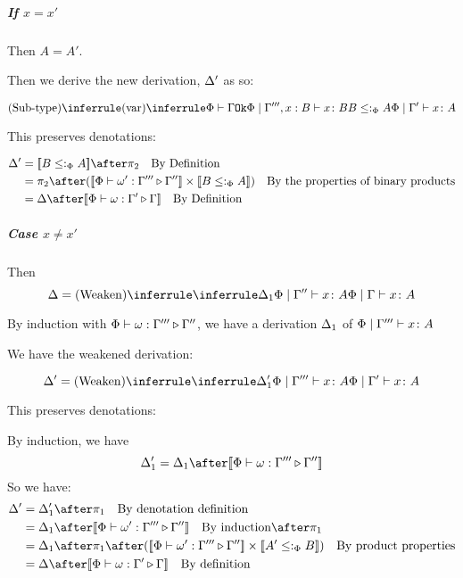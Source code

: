 {        \subparagraph{If $x = x'$}

        Then $A = A'$.

        Then we derive the new derivation, $\Delta'$ as so:

        \begin{equation}
            \ntreeruleII{Sub-type}{
                \ntreeruleI{var}{\oke{\P}{\G}}{\etyperelation{\P}{\G''', x: B}{x}{B}}
                }{
                B \subtypep A
            }{
                \etyperelation{\P}{\G'}{x}{A}
            }
        \end{equation}

        This preserves denotations:

        \begin{align}
            \D' & = \deno{B\subtypep A}\after\pp\qt{By Definition} \\
             & = \pp\after (\deno{\ewrel{\P}{\w'}{\G'''}{\G''}}\times \deno{B\subtypep A}) \qt{By the properties of binary products}\\
             & = \D\after\deno{\ewrel{\P}{\w}{\G'}{\G}}\qt{By Definition}
        \end{align}

        \subparagraph{Case $x \neq x'$}
        Then 
        \begin{equation}
            \D = \ntreeruleI{Weaken}{\treeruleI{\D_1}{\etyperelation{\P}{\G''}{x}{A}}}{\gpetyperelation{x}{A}}
        \end{equation}

        By induction with $\Phi\vdash \omega : \Gamma''' \triangleright \Gamma''$,
         we have a derivation $\Delta_1$ of $\Phi\mid\Gamma''' \vdash x \colon A$

        We have the weakened derivation:

        \begin{equation}
            \D' = \ntreeruleI{Weaken}{\treeruleI{\D_1'}{\etyperelation{\P}{\G'''}{x}{A}}}{\etyperelation{\P}{\G'}{x}{A}}
        \end{equation}

        This preserves denotations:

        By induction, we have
        \begin{equation}
            \D_1' = \D_1 \after \deno{\ewrel{\P}{\w}{\G'''}{\G''}}
        \end{equation}
        So we have:
        \begin{align}
            \D' &= \D_1' \after \p\qt{By denotation definition}\\
            & = \D_1\after\deno{\ewrel{\P}{\w'}{\G'''}{\G''}}\qt{By induction}\after\p \\
            & = \D_1\after\p\after(\deno{\ewrel{\P}{\w'}{\G'''}{\G''}}\times\deno{A' \subtypep B})\qt{By product properties}\\
            & = \D\after\deno{\ewrel{\P}{\w}{\G'}{\G}}\qt{By definition}
        \end{align}


}
